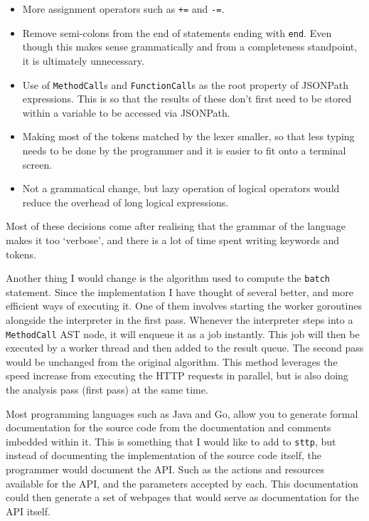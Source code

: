 \begin{itemize}
    \item More assignment operators such as \verb|+=| and \verb|-=|.
    \item Remove semi-colons from the end of statements ending with \verb|end|. Even though this makes sense grammatically and from a completeness standpoint, it is ultimately unnecessary.
    \item Use of \verb|MethodCall|s and \verb|FunctionCall|s as the root property of JSONPath expressions. This is so that the results of these don't first need to be stored within a variable to be accessed via JSONPath.
    \item Making most of the tokens matched by the lexer smaller, so that less typing needs to be done by the programmer and it is easier to fit onto a terminal screen.
    \item Not a grammatical change, but lazy operation of logical operators would reduce the overhead of long logical expressions.
\end{itemize}

Most of these decisions come after realising that the grammar of the language makes it too `verbose', and there is a lot of time spent writing keywords and tokens.

Another thing I would change is the algorithm used to compute the \verb|batch| statement. Since the implementation I have thought of several better, and more efficient ways of executing it. One of them involves starting the worker goroutines alongside the interpreter in the first pass. Whenever the interpreter steps into a \verb|MethodCall| AST node, it will enqueue it as a job instantly. This job will then be executed by a worker thread and then added to the result queue. The second pass would be unchanged from the original algorithm. This method leverages the speed increase from executing the HTTP requests in parallel, but is also doing the analysis pass (first pass) at the same time.

Most programming languages such as Java and Go, allow you to generate formal documentation for the source code from the documentation and comments imbedded within it. This is something that I would like to add to \verb|sttp|, but instead of documenting the implementation of the source code itself, the programmer would document the API. Such as the actions and resources available for the API, and the parameters accepted by each. This documentation could then generate a set of webpages that would serve as documentation for the API itself.
